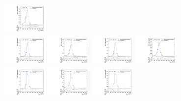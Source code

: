 \begin{figure}[htpb]
  \includegraphics[width=0.2\textwidth]{fig/2Dfit/templateVsReco_VBFZprToWW2000_r0_MJ_mu_LP_bb_HDy.pdf}\\
  \includegraphics[width=0.2\textwidth]{fig/2Dfit/templateVsReco_VBFZprToWW2000_r0_MJ_mu_HP_nobb_LDy.pdf}
  \includegraphics[width=0.2\textwidth]{fig/2Dfit/templateVsReco_VBFZprToWW2000_r0_MJ_mu_LP_nobb_LDy.pdf}
  \includegraphics[width=0.2\textwidth]{fig/2Dfit/templateVsReco_VBFZprToWW2000_r0_MJ_mu_HP_nobb_HDy.pdf}
  \includegraphics[width=0.2\textwidth]{fig/2Dfit/templateVsReco_VBFZprToWW2000_r0_MJ_mu_LP_nobb_HDy.pdf}\\
  \includegraphics[width=0.2\textwidth]{fig/2Dfit/templateVsReco_VBFZprToWW2000_r0_MJ_mu_HP_vbf_LDy.pdf}
  \includegraphics[width=0.2\textwidth]{fig/2Dfit/templateVsReco_VBFZprToWW2000_r0_MJ_mu_LP_vbf_LDy.pdf}
  \includegraphics[width=0.2\textwidth]{fig/2Dfit/templateVsReco_VBFZprToWW2000_r0_MJ_mu_HP_vbf_HDy.pdf}

\end{figure}
